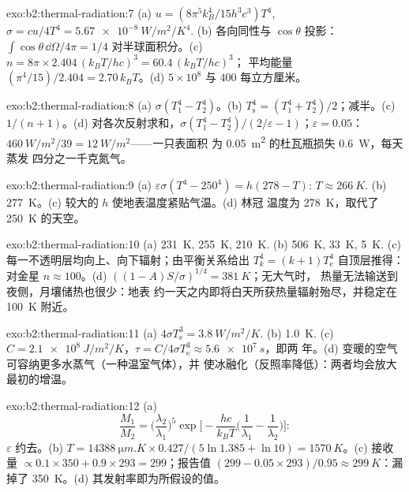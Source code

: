 \begin{solution}{exo:b2:thermal-radiation:7}
(a) $u = (8\pi^5k_B^4/15h^3c^3)T^4$, $\sigma = cu/4T^4 = \qty{5.67e-8}{W/m^2/K^4}$.
(b) 各向同性与 $\cos\theta$ 投影：$\int\cos\theta\,\dd\Omega/4\pi = 1/4$
对半球面积分。(c) $n = 8\pi \times 2.404\,(k_BT/hc)^3 = 60.4\,(k_BT/hc)^3$；
平均能量 $(\pi^4/15)/2.404 = 2.70\,k_BT$。(d) $5 \times 10^8$ 与 $400$
每立方厘米。
\end{solution}

\begin{solution}{exo:b2:thermal-radiation:8}
(a) $\sigma(T_1^4 - T_2^4)$。(b) $T_{\text{s}}^4 = (T_1^4 + T_2^4)/2$；减半。(c)
$1/(n + 1)$。(d) 对各次反射求和，$\sigma(T_1^4 - T_2^4)/(2/\varepsilon -
1)$；$\varepsilon = 0.05$：$\qty{460}{W/m^2}/39 = \qty{12}{W/m^2}$——一只表面积
为 \qty{0.05}{m^2} 的杜瓦瓶损失 \qty{0.6}{W}，每天蒸发
四分之一千克氮气。
\end{solution}

\begin{solution}{exo:b2:thermal-radiation:9}
(a) $\varepsilon\sigma(T^4 - 250^4) = h(278 - T)$: $T \approx \qty{266}{K}$. (b)
\qty{277}{K}。(c) 较大的 $h$ 使地表温度紧贴气温。(d) 林冠
温度为 \qty{278}{K}，取代了 \qty{250}{K} 的天空。
\end{solution}

\begin{solution}{exo:b2:thermal-radiation:10}
(a) \qty{231}{K}, \qty{255}{K}, \qty{210}{K}. (b) \qty{506}{K}, \qty{33}{K}, \qty{5}{K}.
(c) 每一不透明层均向上、向下辐射；由平衡关系给出
$T_k^4 = (k + 1)T_{\text{e}}^4$ 自顶层推得：对金星 $n \approx 100$。(d)
$((1 - A)S/\sigma)^{1/4} = \qty{381}{K}$；无大气时，
热量无法输送到夜侧，月壤储热也很少：地表
约一天之内即将白天所获热量辐射殆尽，并稳定在
\qty{100}{K} 附近。
\end{solution}

\begin{solution}{exo:b2:thermal-radiation:11}
(a) $4\sigma T_{\text{e}}^3 = \qty{3.8}{W/m^2/K}$. (b) \qty{1.0}{K}. (c) $C =
\qty{2.1e8}{J/m^2/K}$，$\tau = C/4\sigma T_{\text{e}}^3 \approx \qty{5.6e7}{s}$，即两
年。(d) 变暖的空气可容纳更多水蒸气（一种温室气体），并
使冰融化（反照率降低）：两者均会放大最初的增温。
\end{solution}

\begin{solution}{exo:b2:thermal-radiation:12}
(a)
\[
\frac{M_1}{M_2} = \Big(\frac{\lambda_2}{\lambda_1}\Big)^5\exp\Big[-\frac{hc}{k_BT}\Big(\frac{1}{\lambda_1} - \frac{1}{\lambda_2}\Big)\Big] :
\]
$\varepsilon$ 约去。(b) $T = \qty{14388}{\micro m.K} \times 0.427/(5\ln 1.385 +
\ln 10) = \qty{1570}{K}$。(c) 接收量 $\propto 0.1 \times 350 + 0.9 \times 293 =
299$；报告值 $(299 - 0.05 \times 293)/0.95 \approx \qty{299}{K}$：漏掉了
\qty{350}{K}。(d) 其发射率即为所假设的值。
\end{solution}

